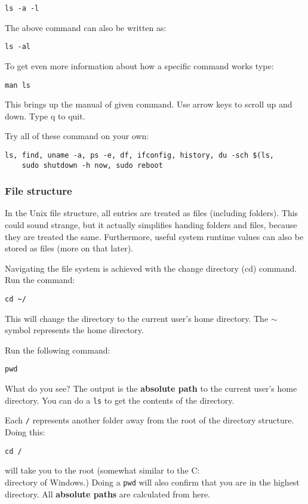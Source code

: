 \documentclass[a4paper]{article}
\begin{document}
\begin{lstlisting}
ls -a -l
\end{lstlisting}
The above command can also be written as:
\begin{lstlisting}
ls -al
\end{lstlisting}

To get even more information about how a specific command works type: 
\begin{lstlisting}
man ls
\end{lstlisting}
This brings up the manual of given command. Use arrow keys to scroll up and down. Type q to quit. 

Try all of these command on your own:
\begin{lstlisting}
ls, find, uname -a, ps -e, df, ifconfig, history, du -sch $(ls, 
	sudo shutdown -h now, sudo reboot
\end{lstlisting}

\subsubsection{File structure}
In the Unix file structure, all entries are treated as files (including folders). This could sound strange, but it actually simplifies handing folders and files, because they are treated the same. Furthermore, useful system runtime values can also be stored as files (more on that later). 

Navigating the file system is achieved with the change directory (cd) command. Run the command: 

\begin{lstlisting}
cd ~/
\end{lstlisting}
This will change the directory to the current user's home directory. The $\sim$ symbol represents the home directory. 

Run the following command: 
\begin{lstlisting}
pwd
\end{lstlisting}
What do you see? The output is the \textbf{absolute path} to the current user's home directory. You can do a \texttt{ls} to get the contents of the directory. 

Each \texttt{/} represents another folder away from the root of the directory structure. Doing this:
\begin{lstlisting}
cd /
\end{lstlisting}
will take you to the root (somewhat similar to the C:\\ directory of Windows.) Doing a \texttt{pwd} will also confirm that you are in the highest directory. All \textbf{absolute paths} are calculated from here.
\end{document}
